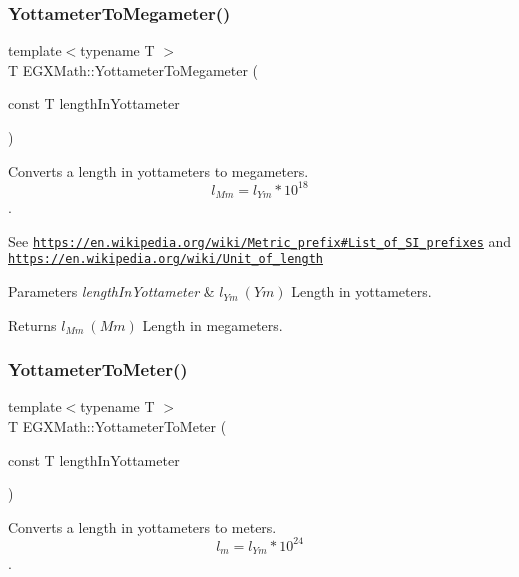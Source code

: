 \subsubsection{\texorpdfstring{Yottameter\+To\+Megameter()}{YottameterToMegameter()}}
{\footnotesize\ttfamily template$<$typename T $>$ \\
T E\+G\+X\+Math\+::\+Yottameter\+To\+Megameter (\begin{DoxyParamCaption}\item[{const T}]{length\+In\+Yottameter }\end{DoxyParamCaption})}



Converts a length in yottameters to megameters. \[ l_{Mm}=l_{Ym} * 10^{18} \]. 

See \href{https://en.wikipedia.org/wiki/Metric_prefix#List_of_SI_prefixes}{\tt https\+://en.\+wikipedia.\+org/wiki/\+Metric\+\_\+prefix\#\+List\+\_\+of\+\_\+\+S\+I\+\_\+prefixes} and \href{https://en.wikipedia.org/wiki/Unit_of_length}{\tt https\+://en.\+wikipedia.\+org/wiki/\+Unit\+\_\+of\+\_\+length} 
\begin{DoxyParams}{Parameters}
{\em length\+In\+Yottameter} & $ l_{Ym}\ (Ym)$ Length in yottameters. \\
\hline
\end{DoxyParams}
\begin{DoxyReturn}{Returns}
$ l_{Mm}\ (Mm)$ Length in megameters. 
\end{DoxyReturn}
\mbox{\label{group___e_g_x_math-_conversions-_length_conversions-_s_i-_yottameter-_s_i_ga01c4f2e699cc2b062bdd2e81073a7ef2}} 
\subsubsection{\texorpdfstring{Yottameter\+To\+Meter()}{YottameterToMeter()}}
{\footnotesize\ttfamily template$<$typename T $>$ \\
T E\+G\+X\+Math\+::\+Yottameter\+To\+Meter (\begin{DoxyParamCaption}\item[{const T}]{length\+In\+Yottameter }\end{DoxyParamCaption})}



Converts a length in yottameters to meters. \[ l_{m}=l_{Ym} * 10^{24} \]. 


